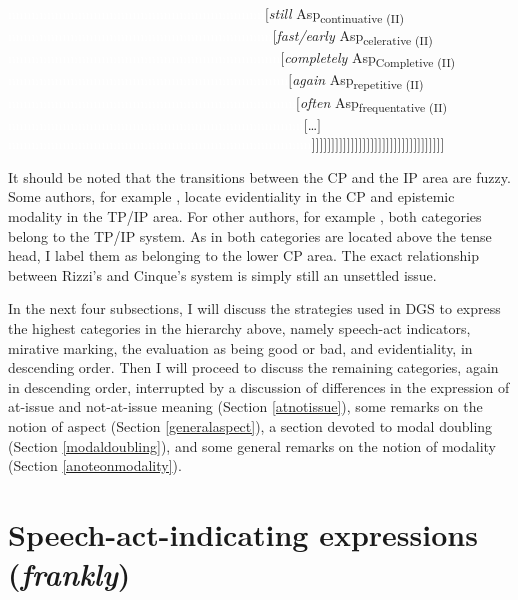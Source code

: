 \begin{exe}
{\textcolor{white}{nnnnnnnnnnnnnnnnnnnnnnnnnnnnnnnnn}$[$\textit{still} Asp\textsubscript{continuative (II)} \\
\textcolor{white}{nnnnnnnnnnnnnnnnnnnnnnnnnnnnnnnnnn}$[$\textit{fast/early} Asp\textsubscript{celerative (II)} \\
\textcolor{white}{nnnnnnnnnnnnnnnnnnnnnnnnnnnnnnnnnnn}$[$\textit{completely} Asp\textsubscript{Completive (II)} \\
\textcolor{white}{nnnnnnnnnnnnnnnnnnnnnnnnnnnnnnnnnnnn}$[$\textit{again} Asp\textsubscript{repetitive (II)} \\
\textcolor{white}{nnnnnnnnnnnnnnnnnnnnnnnnnnnnnnnnnnnnn}$[$\textit{often} Asp\textsubscript{frequentative (II)} \\
\textcolor{white}{nnnnnnnnnnnnnnnnnnnnnnnnnnnnnnnnnnnnnn}$[$\dots$]$ \\
\textcolor{white}{nnnnnnnnnnnnnnnnnnnnnnnnnnnnnnnnnnnnnnn}$]]]]]]]]]]]]]]]]]]]]]]]]]]]]]]]]]]$ }
\end{exe}
\clearpage 

\noindent It should be noted that the transitions between the CP and the IP area are fuzzy. Some authors, for example \citet{van2013clause}, locate evidentiality in the CP and epistemic modality in the TP/IP area. For other authors, for example \citet{matthewson2007evidentials}, both categories belong to the TP/IP system. As in \citet{cinque1999adverbs, cinque2006restructuring} both categories are located above the tense head, I label them as belonging to the lower CP area. The exact relationship between Rizzi's and Cinque's system is simply still an unsettled issue.

In the next four subsections, I will discuss the strategies used in DGS to express the highest categories in the hierarchy above, namely speech-act indicators, mirative marking, the evaluation as being good or bad, and evidentiality, in descending order. Then I will proceed to discuss the remaining categories, again in descending order, interrupted by a discussion of differences in the expression of at-issue and not-at-issue meaning (Section \ref{atnotissue}), some remarks on the notion of aspect (Section \ref{generalaspect}), a section devoted to modal doubling (Section \ref{modaldoubling}), and some general remarks on the notion of modality (Section \ref{anoteonmodality}).

\section{Speech-act-indicating expressions (\textit{frankly})}
